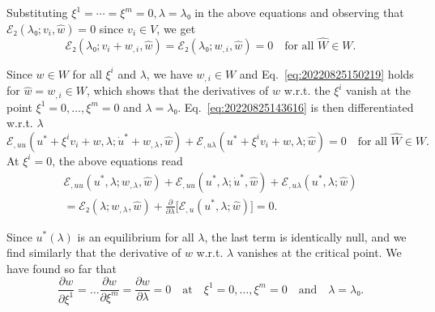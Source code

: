\documentclass[12pt, final]{scrartcl}
\theoremstyle{definition}
\newcommand{\wrt}{w.r.t.}
\begin{document}
Substituting \(ξ^1 = \cdots = ξ^m = 0, λ = λ₀\) in the above equations and
observing that \(ℰ₂(λ₀; v_i, \hat{w}) = 0\) since \(v_i ∈ V\), we get
\begin{equation}
\label{eq:20220825150219}
  ℰ₂(λ₀; v_i + w_{,i}, \hat{w}) = ℰ₂(λ₀; w_{,i}, \hat{w}) = 0 \quad \text{for all }\hat{W} ∈ W.
\end{equation}

Since \(w ∈ W\) for all \(ξ^i\) and \(λ\), we have \(w_{,i} ∈ W\) and
Eq.~\eqref{eq:20220825150219} holds for \(\hat{w} = w_{,i} ∈ W\), which shows
that the derivatives of \(w\) \wrt{} the \(ξ^i\) vanish at the point
\(ξ^1 = 0, \ldots, ξ^m = 0\) and \(λ = λ₀\). Eq.~\eqref{eq:20220825143616} is
then differentiated \wrt{} \(λ\)
\begin{equation}
  \label{eq:20220830145945}
  ℰ_{,uu}(u^\ast + ξ^i v_i + w, λ; \dot{u}^\ast + w_{,λ}, \hat{w}) + ℰ_{,uλ}(u^\ast + ξ^i v_i + w, λ; \hat{w}) = 0 \quad \text{for all }\hat{W} ∈ W.
\end{equation}
At \(ξ^i = 0\), the above equations read
\begin{multline}
  \label{eq:20220830151513}
  ℰ_{,uu}(u^\ast, λ; w_{,λ}, \hat{w}) + ℰ_{,uu}(u^\ast, λ; \dot{u}^\ast, \hat{w}) + ℰ_{,uλ}(u^\ast, λ; \hat{w})\\
  = ℰ₂(λ; w_{,λ}, \hat{w}) + \frac{∂}{∂λ}\bigl[ ℰ_{,u}(u^\ast, λ; \hat{w}) \bigr] = 0.
\end{multline}

Since \(u^\ast(λ)\) is an equilibrium for all \(λ\), the last term is
identically null, and we find similarly that the derivative of \(w\) \wrt{} \(λ\)
vanishes at the critical point. We have found so far that
\begin{equation}
  \frac{∂w}{∂ξ^1} = \ldots \frac{∂w}{∂ξ^m} = \frac{∂w}{∂λ} = 0 \quad \text{at} \quad ξ^1 = 0, \ldots, ξ^m = 0 \quad \text{and} \quad λ = λ₀.
\end{equation}
\end{document}
